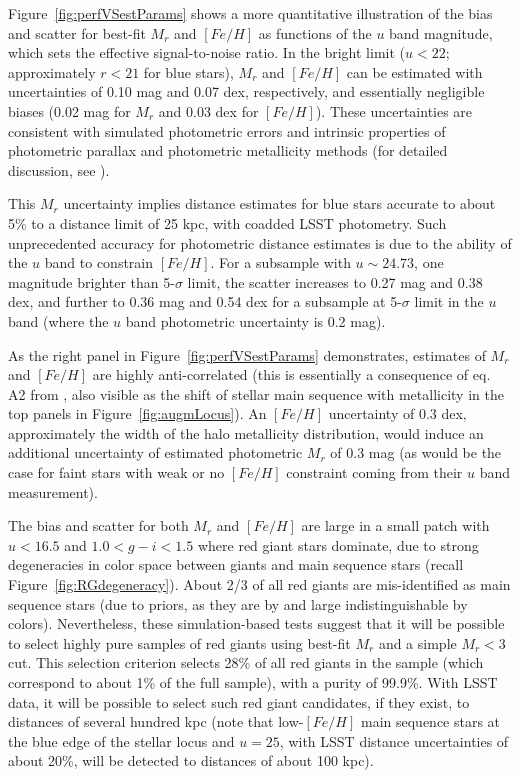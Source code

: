 Figure~\ref{fig:perfVSestParams} shows a more quantitative illustration of the bias and scatter for best-fit $M_r$ and $[Fe/H]$ as
functions of the $u$ band magnitude, which sets the effective signal-to-noise ratio. In the bright limit ($u < 22$; approximately
$r<21$ for blue stars), $M_r$ and $[Fe/H]$ can be estimated with uncertainties of 0.10 mag and 0.07 dex, respectively, and essentially
negligible biases (0.02 mag for $M_r$ and 0.03 dex for $[Fe/H]$). These uncertainties are consistent with simulated photometric errors
and intrinsic properties of photometric parallax and photometric metallicity methods (for detailed discussion, see \citealt{2008ApJ...684..287I}). 

This $M_r$ uncertainty implies distance estimates for blue stars accurate to about 5\% to a distance limit of 25 kpc, with coadded LSST
photometry.  Such unprecedented accuracy for photometric distance estimates is due
to the ability of the $u$ band to constrain $[Fe/H]$. For a subsample with $u\sim24.73$, one magnitude brighter than 5-$\sigma$ limit,
the scatter increases to 0.27 mag and 0.38 dex, and further to 0.36 mag and 0.54 dex for a subsample at 5-$\sigma$ limit in the $u$ band
(where the $u$ band photometric uncertainty is 0.2 mag).  
 
As the right panel in Figure~\ref{fig:perfVSestParams} demonstrates, estimates of $M_r$ and $[Fe/H]$ are highly anti-correlated (this is essentially a
consequence of eq. A2 from \citealt{2008ApJ...684..287I}, also visible as the shift of stellar main sequence with metallicity in the top
panels in Figure~\ref{fig:augmLocus}). An $[Fe/H]$ uncertainty of 0.3 dex, approximately the width of the halo metallicity distribution, 
would induce an additional uncertainty of estimated photometric $M_r$ of 0.3 mag (as would be the case for faint stars with weak or no $[Fe/H]$ constraint
coming from their $u$ band measurement). 

The bias and scatter for both $M_r$ and $[Fe/H]$ are large in a small patch with $u<16.5$ and $1.0 < g-i < 1.5$ where red giant stars dominate,
due to strong degeneracies in color space between giants and main sequence stars (recall Figure~\ref{fig:RGdegeneracy}). 
About 2/3 of all red giants are mis-identified as main sequence stars (due to priors, as they are by and large indistinguishable by colors). 
Nevertheless, these simulation-based tests suggest that it will be possible to select highly pure samples of red giants using best-fit
$M_r$ and a simple $M_r < 3$ cut. This selection criterion selects 28\% of all red giants in the sample (which correspond to about 1\% of the full
sample), with a purity of 99.9\%. With LSST data, it will be possible to select such red giant candidates, if they exist, to
distances of several hundred kpc (note that low-$[Fe/H]$ main sequence stars at the blue edge of the stellar locus and $u=25$, with
LSST distance uncertainties of about 20\%, will be detected to distances of about 100 kpc).
 

